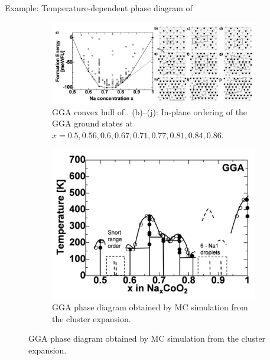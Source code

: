 \documentclass[aspectratio=169]{beamer}
\begin{document}
    \begin{frame}{Example: Temperature-dependent phase diagram of }
        \begin{figure}
            \centering
            \begin{subfigure}{0.55\textwidth}
                \centering
                \includegraphics[width=\linewidth]{lectures/figures/10_NCO_PD.png}
                \caption{GGA convex hull of . (b)–(j): In-plane ordering of the GGA ground states at $x = 0.5, 0.56, 0.6, 0.67, 0.71, 0.77, 0.81, 0.84, 0.86$.}
            \end{subfigure}
            \begin{subfigure}{0.4\textwidth}
                \centering
                \includegraphics[width=\linewidth]{lectures/figures/10_NCO_CE_PD.png}
                \caption{GGA phase diagram obtained by MC simulation from the cluster expansion.\cite{hinumaTemperatureconcentrationPhaseDiagram2008}}
            \end{subfigure}
        \end{figure}
    \end{frame}
\end{document}
